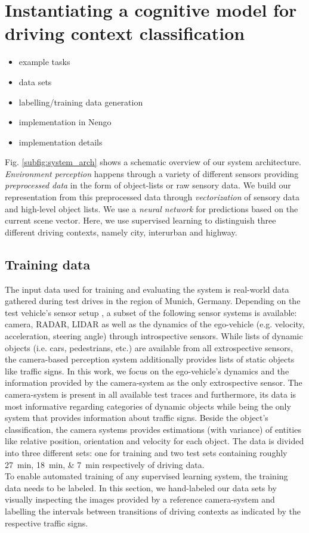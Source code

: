 \chapter{Instantiating a cognitive model for driving context classification}
\begin{itemize}
	\item example tasks
	\item data sets
	\item labelling/training data generation
	\item implementation in \ac{Nengo}
	\item implementation details
\end{itemize}
\label{sec:driving_context_class}
Fig. \ref{subfig:system_arch} shows a schematic overview of our system architecture.
\textit{Environment perception} happens through a variety of different sensors \cite{Aeberhard2015} providing \textit{preprocessed data} in the form of object-lists or raw sensory data.
We build our representation from this preprocessed data through \textit{vectorization} of sensory data and high-level object lists.
We use a \textit{neural network} for predictions based on the current scene vector.
Here, we use supervised learning to distinguish three different driving contexts, namely city, interurban and highway.
\section{Training data}
The input data used for training and evaluating the system is real-world data gathered during test drives in the region of Munich, Germany.
Depending on the test vehicle's sensor setup \cite{Aeberhard2015}, a subset of the following sensor systems is available: camera, RADAR, LIDAR as well as the dynamics of the ego-vehicle (e.g. velocity, acceleration, steering angle) through introspective sensors.
While lists of dynamic objects (i.e. cars, pedestrians, etc.) are available from all extrospective sensors, the camera-based perception system additionally provides lists of static objects like traffic signs.
In this work, we focus on the ego-vehicle's dynamics and the information provided by the camera-system as the only extrospective sensor.
The camera-system is present in all available test traces and furthermore, its data is most informative regarding categories of dynamic objects while being the only system that provides information about traffic signs.
Beside the object's classification, the camera systems provides estimations (with variance) of entities like relative position, orientation and velocity for each object.
The data is divided into three different sets: one for training and two test sets containing roughly \SIlist{27;18;7}{\minute} respectively of driving data.\\
To enable automated training of any supervised learning system, the training data needs to be labeled.
In this section, we hand-labeled our data sets by visually inspecting the images provided by a reference camera-system and labelling the intervals  between transitions of driving contexts as indicated by the respective traffic signs.
